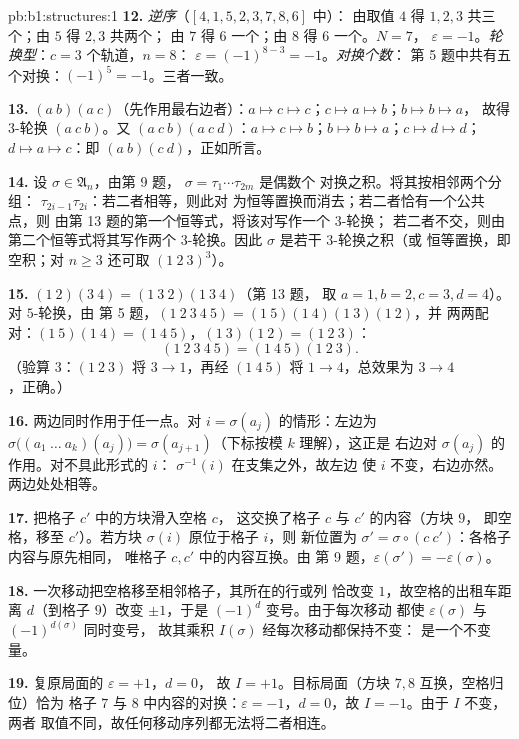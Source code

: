 \begin{solution}{pb:b1:structures:1}
\textbf{12.} \emph{逆序}（$[4, 1, 5, 2, 3, 7, 8, 6]$ 中）：
由取值 $4$ 得 $1, 2, 3$ 共三个；由 $5$ 得 $2, 3$ 共两个；
由 $7$ 得 $6$ 一个；由 $8$ 得 $6$ 一个。$N = 7$，
$\varepsilon = -1$。\emph{轮换型}：$c = 3$ 个轨道，$n = 8$：
$\varepsilon = (-1)^{8-3} = -1$。\emph{对换个数}：
第 5 题中共有五个对换：$(-1)^5 = -1$。三者一致。

\textbf{13.} $(a\ b)(a\ c)$（先作用最右边者）：$a \mapsto c
\mapsto c$；$c \mapsto a \mapsto b$；$b \mapsto b \mapsto a$，
故得 $3$-轮换 $(a\ c\ b)$。又 $(a\ c\ b)(a\ c\ d)$：$a \mapsto c
\mapsto b$；$b \mapsto b \mapsto a$；$c \mapsto d \mapsto d$；$d
\mapsto a \mapsto c$：即 $(a\ b)(c\ d)$，正如所言。

\textbf{14.} 设 $\sigma \in \mathfrak A_n$，由第 9 题，
$\sigma = \tau_1\cdots\tau_{2m}$ 是偶数个
对换之积。将其按相邻两个分组：
$\tau_{2i-1}\tau_{2i}$：若二者相等，则此对
为恒等置换而消去；若二者恰有一个公共点，则
由第 13 题的第一个恒等式，将该对写作一个 $3$-轮换；
若二者不交，则由第二个恒等式将其写作两个
$3$-轮换。因此 $\sigma$ 是若干 $3$-轮换之积（或
恒等置换，即空积；对 $n \geq 3$ 还可取 $(1\ 2\
3)^3$）。

\textbf{15.} $(1\ 2)(3\ 4) = (1\ 3\ 2)(1\ 3\ 4)$（第 13 题，
取 $a{=}1, b{=}2, c{=}3, d{=}4$）。对 $5$-轮换，由
第 5 题，$(1\ 2\ 3\ 4\ 5) = (1\ 5)(1\ 4)(1\ 3)(1\ 2)$，并
两两配对：$(1\ 5)(1\ 4) = (1\ 4\ 5)$，$(1\ 3)(1\ 2) = (1\ 2\ 3)$：
\[
(1\ 2\ 3\ 4\ 5) = (1\ 4\ 5)(1\ 2\ 3) .
\]
（验算 $3$：$(1\ 2\ 3)$
将 $3 \to 1$，再经 $(1\ 4\ 5)$ 将 $1 \to 4$，总效果为 $3 \to 4$，正确。）

\textbf{16.} 两边同时作用于任一点。对 $i =
\sigma(a_j)$ 的情形：左边为 $\sigma\bigl((a_1\ \dots\
a_k)(a_j)\bigr) = \sigma(a_{j+1})$（下标按模 $k$ 理解），这正是
右边对 $\sigma(a_j)$ 的作用。对不具此形式的 $i$：
$\sigma^{-1}(i)$ 在支集之外，故左边
使 $i$ 不变，右边亦然。两边处处相等。

\textbf{17.} 把格子 $c'$ 中的方块滑入空格 $c$，
这交换了格子 $c$ 与 $c'$ 的内容（方块 $9$，
即空格，移至 $c'$）。若方块 $\sigma(i)$ 原位于格子 $i$，则
新位置为 $\sigma' = \sigma \circ (c\ c')$：各格子内容与原先相同，
唯格子 $c, c'$ 中的内容互换。由
第 9 题，$\varepsilon(\sigma') = -\varepsilon(\sigma)$。

\textbf{18.} 一次移动把空格移至相邻格子，其所在的行或列
恰改变 $1$，故空格的出租车距离
$d$（到格子 $9$）改变 $\pm1$，于是 $(-1)^d$ 变号。由于每次移动
都使 $\varepsilon(\sigma)$ 与 $(-1)^{d(\sigma)}$ 同时变号，
故其乘积 $I(\sigma)$ 经每次移动都保持不变：
是一个不变量。

\textbf{19.} 复原局面的 $\varepsilon = +1$，$d = 0$，
故 $I = +1$。目标局面（方块 $7, 8$ 互换，空格归位）恰为
格子 $7$ 与 $8$ 中内容的对换：$\varepsilon
= -1$，$d = 0$，故 $I = -1$。由于 $I$ 不变，两者
取值不同，故任何移动序列都无法将二者相连。


\end{solution}
